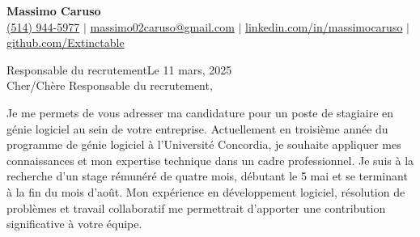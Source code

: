 \documentclass[10pt]{article}
\begin{document}
\newcommand{\fullname}{Massimo Caruso}
\newcommand{\phone}{(514) 944-5977}
\newcommand{\email}{massimo02caruso@gmail.com}
\newcommand{\linkedin}{linkedin.com/in/massimocaruso}
\newcommand{\github}{github.com/Extinctable}

\newcommand*{\hiringManager}{Responsable du recrutement}
\newcommand*{\company}{your company}
\newcommand*{\address}{8370 Bd Lacordaire Bureau 306, Saint-Leonard, Quebec H1R 3Y6}

\newcommand*{\position}{Software Engineering Intern}
\newcommand*{\companyDetails}{its dedication to supporting the professional and entrepreneurial growth of the Italian-Canadian business community through innovation and collaboration}
\newcommand*{\positionDetails}{contribute to the development of digital solutions that enhance community engagement, streamline business operations, and support CIBPA's mission of fostering economic growth}

\begin{center}
    {\Huge \textbf{\fullname}} \\
    \vspace{1mm}
    {\small 
    \faPhone \hspace{0mm} \href{tel:+15149445977}{\phone} $\vert$ 
    \faEnvelope \hspace{0mm} \href{mailto:massimo02caruso@gmail.com}{\email} $\vert$ 
    \faLinkedin \hspace{0mm} \href{https://linkedin.com/in/massimocaruso}{\linkedin} $\vert$ 
    \faGithub \hspace{0mm} \href{https://github.com/Extinctable}{\github}
    }
\end{center}


\vspace{1.5em}
\hiringManager \hfill Le 11 mars, 2025 \\



\vspace{1.5em}
Cher/Chère \hiringManager,

Je me permets de vous adresser ma candidature pour un poste de stagiaire en génie logiciel au sein de votre entreprise. Actuellement en troisième année du programme de génie logiciel à l'Université Concordia, je souhaite appliquer mes connaissances et mon expertise technique dans un cadre professionnel. Je suis à la recherche d'un stage rémunéré de quatre mois, débutant le 5 mai et se terminant à la fin du mois d’août. Mon expérience en développement logiciel, résolution de problèmes et travail collaboratif me permettrait d’apporter une contribution significative à votre équipe.
\end{document}
